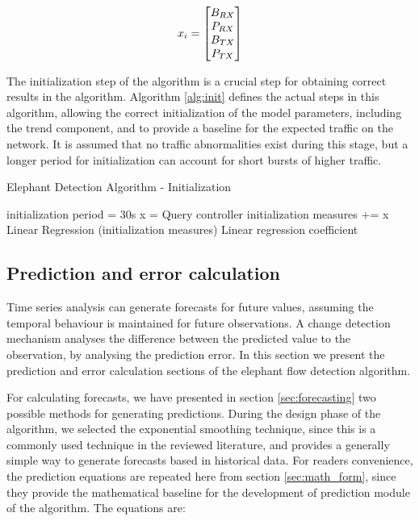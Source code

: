 \begin{equation}
    \centering
    x_i = 
    \begin{bmatrix}
    B_{RX}\\
    P_{RX}\\
    B_{TX}\\
    P_{TX}\\
    \end{bmatrix}
    \label{mat:port_stats}
\end {equation}

The initialization step of the algorithm is a crucial step for obtaining correct results in the algorithm. Algorithm \ref{alg:init} defines the actual steps in this
algorithm, allowing the correct initialization of the model parameters, including the trend component, and to provide a baseline for the expected traffic on the
network. It is assumed that no traffic abnormalities exist during this stage, but a longer period for initialization can account for short bursts of higher traffic.

\begin{algorithm}[H]
    \caption{Elephant Detection Algorithm - Initialization} \label{alg:init}
    \begin{algorithmic}[1]
            \State initialization period = 30s
                \State x = Query controller
                \State initialization measures += x
            \EndWhile
            \State Linear Regression (initialization measures)
        \State \Return Linear regression coefficient
    \end{algorithmic}
\end{algorithm}


\subsection{Prediction and error calculation}

Time series analysis can generate forecasts for future values, assuming the temporal behaviour is maintained for future observations. A change detection mechanism
analyses the difference between the predicted value to the observation, by analysing the prediction error. In this section we present the prediction and error
calculation sections of the elephant flow detection algorithm.

\par For calculating forecasts, we have presented in section \ref{sec:forecasting} two possible methods for generating predictions. During the design phase of the 
algorithm, we selected the exponential smoothing technique, since this is a commonly used technique \cite{jasek_usage_2013, munz_traffic_2010} in the reviewed
literature, and provides a generally simple way to generate forecasts based in historical data. For readers convenience, the prediction equations are repeated 
here from section \ref{sec:math_form}, since they provide the mathematical baseline for the  development of prediction module of the algorithm. The equations are:

